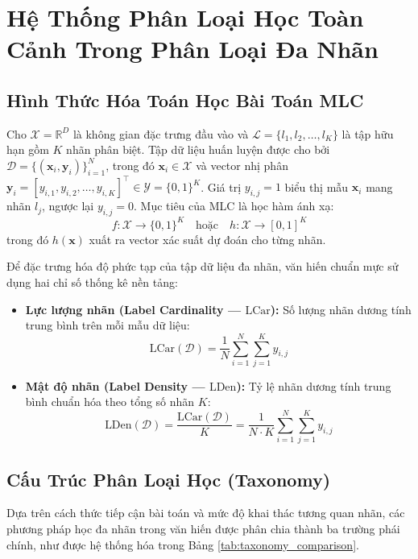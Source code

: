 \documentclass[1p,times]{elsarticle}
\begin{document}
\section{Hệ Thống Phân Loại Học Toàn Cảnh Trong Phân Loại Đa Nhãn}
\label{sec:taxonomy}

\subsection{Hình Thức Hóa Toán Học Bài Toán MLC}
Cho $\mathcal{X} = \mathbb{R}^D$ là không gian đặc trưng đầu vào và $\mathcal{L} = \{l_1, l_2, \dots, l_K\}$ là tập hữu hạn gồm $K$ nhãn phân biệt. Tập dữ liệu huấn luyện được cho bởi $\mathcal{D} = \{(\mathbf{x}_i, \mathbf{y}_i)\}_{i=1}^N$, trong đó $\mathbf{x}_i \in \mathcal{X}$ và vector nhị phân $\mathbf{y}_i = [y_{i,1}, y_{i,2}, \dots, y_{i,K}]^\top \in \mathcal{Y} = \{0, 1\}^K$. Giá trị $y_{i,j} = 1$ biểu thị mẫu $\mathbf{x}_i$ mang nhãn $l_j$, ngược lại $y_{i,j} = 0$. Mục tiêu của MLC là học hàm ánh xạ:
\begin{equation}
    f: \mathcal{X} \to \{0, 1\}^K \quad \text{hoặc} \quad h: \mathcal{X} \to [0, 1]^K
\end{equation}
trong đó $h(\mathbf{x})$ xuất ra vector xác suất dự đoán cho từng nhãn.

Để đặc trưng hóa độ phức tạp của tập dữ liệu đa nhãn, văn hiến chuẩn mực \citep{tsoumakas2007multi, zhang2014review} sử dụng hai chỉ số thống kê nền tảng:
\begin{itemize}
    \item \textbf{Lực lượng nhãn (Label Cardinality — $\text{LCar}$):} Số lượng nhãn dương tính trung bình trên mỗi mẫu dữ liệu:
    \begin{equation}
        \text{LCar}(\mathcal{D}) = \frac{1}{N} \sum_{i=1}^N \sum_{j=1}^K y_{i,j}
    \end{equation}
    \item \textbf{Mật độ nhãn (Label Density — $\text{LDen}$):} Tỷ lệ nhãn dương tính trung bình chuẩn hóa theo tổng số nhãn $K$:
    \begin{equation}
        \text{LDen}(\mathcal{D}) = \frac{\text{LCar}(\mathcal{D})}{K} = \frac{1}{N \cdot K} \sum_{i=1}^N \sum_{j=1}^K y_{i,j}
    \end{equation}
\end{itemize}

\subsection{Cấu Trúc Phân Loại Học (Taxonomy)}
Dựa trên cách thức tiếp cận bài toán và mức độ khai thác tương quan nhãn, các phương pháp học đa nhãn trong văn hiến được phân chia thành ba trường phái chính, như được hệ thống hóa trong Bảng \ref{tab:taxonomy_comparison}.
\end{document}

